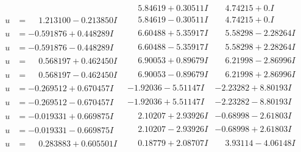 \documentclass[1p]{elsarticle_modified}
\theoremstyle{definition}
\begin{document}
$$\begin{array}{c|c|c}
 & \phantom{-}5.84619 + 0.30511 I & \phantom{-}4.74215 + 0. I\phantom{ +0.000000I} \\ \hline\begin{aligned}
u &= \phantom{-}1.213100 - 0.213850 I\end{aligned}
 & \phantom{-}5.84619 - 0.30511 I & \phantom{-}4.74215 + 0. I\phantom{ +0.000000I} \\ \hline\begin{aligned}
u &= -0.591876 + 0.448289 I\end{aligned}
 & \phantom{-}6.60488 + 5.35917 I & \phantom{-}5.58298 - 2.28264 I \\ \hline\begin{aligned}
u &= -0.591876 - 0.448289 I\end{aligned}
 & \phantom{-}6.60488 - 5.35917 I & \phantom{-}5.58298 + 2.28264 I \\ \hline\begin{aligned}
u &= \phantom{-}0.568197 + 0.462450 I\end{aligned}
 & \phantom{-}6.90053 + 0.89679 I & \phantom{-}6.21998 - 2.86996 I \\ \hline\begin{aligned}
u &= \phantom{-}0.568197 - 0.462450 I\end{aligned}
 & \phantom{-}6.90053 - 0.89679 I & \phantom{-}6.21998 + 2.86996 I \\ \hline\begin{aligned}
u &= -0.269512 + 0.670457 I\end{aligned}
 & -1.92036 - 5.51147 I & -2.23282 + 8.80193 I \\ \hline\begin{aligned}
u &= -0.269512 - 0.670457 I\end{aligned}
 & -1.92036 + 5.51147 I & -2.23282 - 8.80193 I \\ \hline\begin{aligned}
u &= -0.019331 + 0.669875 I\end{aligned}
 & \phantom{-}2.10207 + 2.93926 I & -0.68998 - 2.61803 I \\ \hline\begin{aligned}
u &= -0.019331 - 0.669875 I\end{aligned}
 & \phantom{-}2.10207 - 2.93926 I & -0.68998 + 2.61803 I \\ \hline\begin{aligned}
u &= \phantom{-}0.283883 + 0.605501 I\end{aligned}
 & \phantom{-}0.18779 + 2.08707 I & \phantom{-}3.93114 - 4.06148 I \\ \hline\begin{aligned}

\end{aligned}
\end{array}$$
\end{document}
